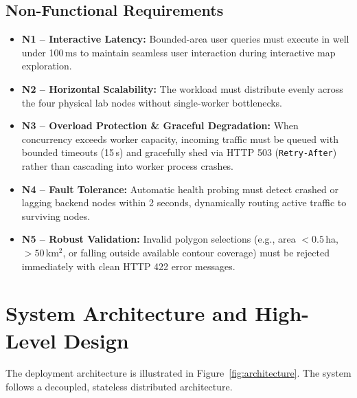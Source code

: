 \documentclass[manuscript,screen,review]{acmart}
\begin{document}
\subsection{Non-Functional Requirements}
\begin{itemize}
    \item \textbf{N1 -- Interactive Latency:} Bounded-area user queries must execute in well under 100\,ms to maintain seamless user interaction during interactive map exploration.
    \item \textbf{N2 -- Horizontal Scalability:} The workload must distribute evenly across the four physical lab nodes without single-worker bottlenecks.
    \item \textbf{N3 -- Overload Protection \& Graceful Degradation:} When concurrency exceeds worker capacity, incoming traffic must be queued with bounded timeouts (15\,s) and gracefully shed via HTTP 503 (\texttt{Retry-After}) rather than cascading into worker process crashes.
    \item \textbf{N4 -- Fault Tolerance:} Automatic health probing must detect crashed or lagging backend nodes within 2 seconds, dynamically routing active traffic to surviving nodes.
    \item \textbf{N5 -- Robust Validation:} Invalid polygon selections (e.g., area $<0.5$\,ha, $>50$\,km$^2$, or falling outside available contour coverage) must be rejected immediately with clean HTTP 422 error messages.
\end{itemize}

\section{System Architecture and High-Level Design}
\label{sec:architecture}
The deployment architecture is illustrated in Figure~\ref{fig:architecture}. The system follows a decoupled, stateless distributed architecture.
\end{document}
